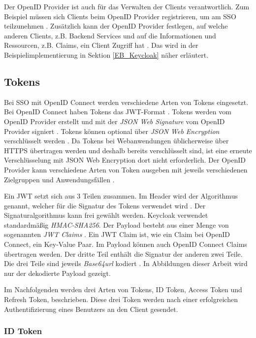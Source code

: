 Der OpenID Provider ist auch für das Verwalten der Clients verantwortlich. Zum Beispiel müssen sich Clients beim OpenID Provider registrieren, um am SSO teilzunehmen \cite[Client Registration]{EB26} \cite{EB57}. Zusätzlich kann der OpenID Provider festlegen, auf welche anderen Clients, z.B. Backend Services und auf die Informationen und Ressourcen, z.B. Claims, ein Client Zugriff hat \cite[Audience Support]{SSEB_keycloakDocs} \cite[ID Token]{EB4}. Das wird in der Beispielimplementierung in Sektion \ref{EB_Keycloak} näher erläutert.

\subsection{Tokens} \label{EB_Tokens}

Bei SSO mit OpenID Connect werden verschiedene Arten von Tokens eingesetzt. Bei OpenID Connect haben Tokens das JWT-Format \cite{SSEB_RFC7519}. Tokens werden vom OpenID Provider erstellt und mit der \textit{JSON Web Signature} vom OpenID Provider signiert \cite{EB5}. Tokens können optional über \textit{JSON Web Encryption} verschlüsselt werden \cite{EB5}. Da Tokens bei Webanwendungen üblicherweise über HTTPS übertragen werden und deshalb bereits verschlüsselt sind, ist eine erneute Verschlüsselung mit JSON Web Encryption dort nicht erforderlich. Der OpenID Provider kann verschiedene Arten von Token ausgeben mit jeweils verschiedenen Zielgruppen und Anwendungsfällen \cite[Token Endpoint]{EB4}.

Ein JWT setzt sich aus 3 Teilen zusammen. Im Header wird der Algorithmus genannt, welcher für die Signatur des Tokens verwendet wird \cite{EB5}. Der Signaturalgorithmus kann frei gewählt werden. Keycloak verwendet standardmäßig \textit{HMAC-SHA256}. Der Payload besteht aus einer Menge von sogenannten \textit{JWT Claims} \cite{EB5}. Ein JWT Claim ist, wie ein Claim bei OpenID Connect, ein Key-Value Paar. Im Payload können auch OpenID Connect Claims übertragen werden. Der dritte Teil enthält die Signatur der anderen zwei Teile. Die drei Teile sind jeweils \textit{Base64url} kodiert \cite{EB5}. In Abbildungen dieser Arbeit wird nur der dekodierte Payload gezeigt.

Im Nachfolgenden werden drei Arten von Tokens, ID Token, Access Token und Refresh Token, beschrieben. Diese drei Token werden nach einer erfolgreichen Authentifizierung eines Benutzers an den Client gesendet.

\subsubsection{ID Token}

